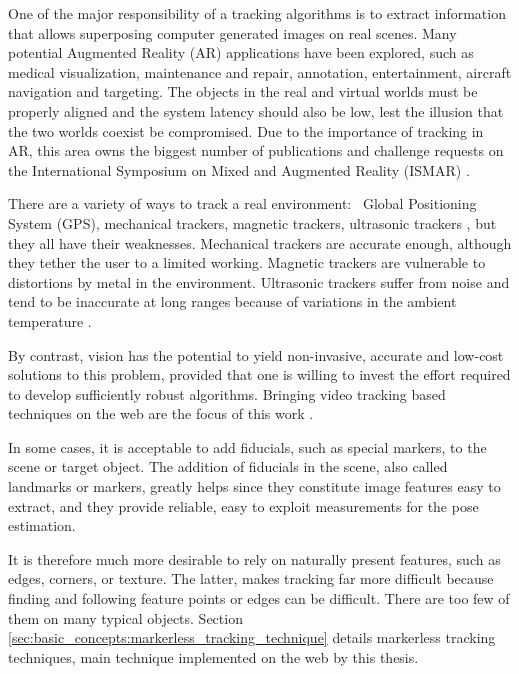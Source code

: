 One of the major responsibility of a tracking algorithms is to extract information that allows superposing computer generated images on real scenes. Many potential Augmented Reality (AR) applications have been explored, such as medical visualization, maintenance and repair, annotation, entertainment, aircraft navigation and targeting. The objects in the real and virtual worlds must be properly aligned and the system latency should also be low, lest the illusion that the two worlds coexist be compromised. \cite{Lepetit2005} Due to the importance of tracking in AR, this area owns the biggest number of publications and challenge requests on the International Symposium on Mixed and Augmented Reality (ISMAR) \cite{Zhou2008}.

There are a variety of ways to track a real environment: \eg\ Global Positioning System (GPS), mechanical trackers, magnetic trackers, ultrasonic trackers \etc, but they all have their weaknesses. Mechanical trackers are accurate enough, although they tether the user to a limited working. Magnetic trackers are vulnerable to distortions by metal in the environment. Ultrasonic trackers suffer from noise and tend to be inaccurate at long ranges because of variations in the ambient temperature \cite{Lepetit2005}.

By contrast, vision has the potential to yield non-invasive, accurate and low-cost solutions to this problem, provided that one is willing to invest the effort required to develop sufficiently robust algorithms. Bringing video tracking based techniques on the web are the focus of this work \cite{Lepetit2005}.

In some cases, it is acceptable to add fiducials, such as special markers, to the scene or target object. The addition of fiducials in the scene, also called landmarks or markers, greatly helps since they constitute image features easy to extract, and they provide reliable, easy to exploit measurements for the pose estimation.

It is therefore much more desirable to rely on naturally present features, such as edges, corners, or texture. The latter, makes tracking far more difficult because finding and following feature points or edges can be difficult. There are too few of them on many typical objects. Section \ref{sec:basic_concepts:markerless_tracking_technique} details markerless tracking techniques, main technique implemented on the web by this thesis.


